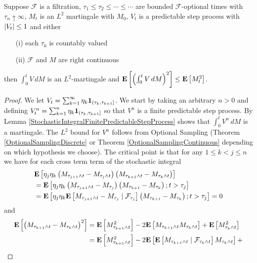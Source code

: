 \begin{lem}\label{StochasticIntegralPredictableStepProcess}Suppose $\mathcal{F}$ is a filtration,  $\tau_1 \leq \tau_2 \leq \dotsb \leq \dotsb$ are bounded $\mathcal{F}$-optional times with $\tau_n \uparrow \infty$, $M_t$ is an $L^2$ martingale with $M_0$, $V_t$ is a predictable step process with $\abs{V_t} \leq 1$ and either
\begin{itemize}
\item[(i)] each $\tau_k$ is countably valued
\item[(ii)]$\mathcal{F}$ and $M$ are right continuous
\end{itemize}
then $\int_0^t V \, dM$ is an $L^2$-martingale and $\expectation{\left(\int_0^t V \, dM\right)^2} \leq \expectation{M^2_t}$.
\end{lem}
\begin{proof}
We let $V_t = \sum_{k=1}^\infty \eta_k \characteristic{(\tau_k, \tau_{k+1}]}$.  We start by taking an arbitrary $n >0$ and defining $V^n_t =  \sum_{k=1}^n \eta_k \characteristic{(\tau_k, \tau_{k+1}]}$ so that $V^n$ is a finite predictable step process.  By Lemma \ref{StochasticIntegralFinitePredictableStepProcess} shows that $\int_0^t V^n \, dM$ is a martingale.  The $L^2$ bound for $V^n$ follows from Optional Sampling (Theorem \ref{OptionalSamplingDiscrete} or Theorem \ref{OptionalSamplingContinuous} depending on which hypothesis we choose).  The critical point is that for any $1 \leq k < j \leq n$ we have for each cross term term of the stochastic integral
\begin{align*}
&\expectation{\eta_j \eta_k \left (M_{\tau_{j+1} \wedge t} - M_{\tau_j \wedge t} \right)  \left (M_{\tau_{k+1} \wedge t} - M_{\tau_k \wedge t} \right)} \\
&=\expectation{\eta_j \eta_k \left (M_{\tau_{j+1} \wedge t} - M_{\tau_j} \right)  \left (M_{\tau_{k+1} } - M_{\tau_k} \right) ; t > \tau_j} \\
&=\expectation{ \eta_j \eta_k \cexpectationlong{\mathcal{F}_{\tau_j}}{M_{\tau_{j+1} \wedge t} - M_{\tau_j }}  \left(M_{\tau_{k+1} } - M_{\tau_k} \right) ; t > \tau_j} =0
\end{align*}
and 
\begin{align*}
\expectation{ \left (M_{\tau_{k+1} \wedge t} - M_{\tau_k \wedge t} \right)^2} &= \expectation{M^2_{\tau_{k+1} \wedge t}} - 2\expectation{M_{\tau_{k+1} \wedge t}M_{\tau_{k} \wedge t}} + 
\expectation{M^2_{\tau_k \wedge t}} \\
&=\expectation{M^2_{\tau_{k+1} \wedge t}} - 2\expectation{\cexpectationlong{\mathcal{F}_{\tau_k \wedge t}}{M_{\tau_{k+1} \wedge t}}M_{\tau_{k} \wedge t}} + 

\end{align*}
\end{proof}
